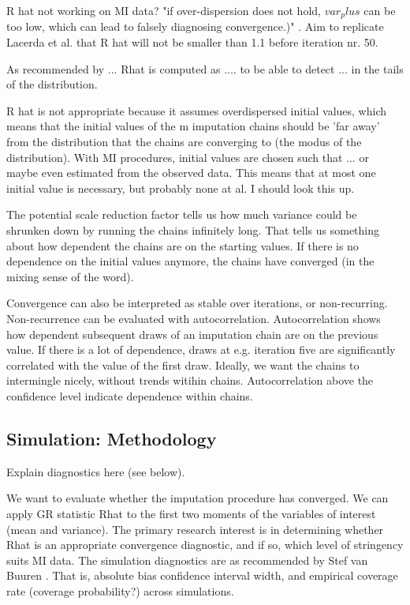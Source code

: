 \documentclass[article]{jss}
\begin{document}
R hat not working on MI data? "if over-dispersion does not hold, $var_plus$ can be too low, which can lead to falsely diagnosing convergence.)" \cite[p~437]{broo98}. Aim to replicate Lacerda et al. that R hat will not be smaller than 1.1 before iteration nr. 50.

As recommended by ... Rhat is computed as .... to be able to detect ... in the tails of the distribution.

R hat is not appropriate because it assumes overdispersed initial values, which means that the initial values of the m imputation chains should be 'far away' from the distribution that the chains are converging to (the modus of the distribution). With MI procedures, initial values are chosen such that ... or maybe even estimated from the observed data. This means that at most one initial value is necessary, but probably none at al. I should look this up. 

The potential scale reduction factor tells us how much variance could be shrunken down by running the chains infinitely long. That tells us something about how dependent the chains are on the starting values. If there is no dependence on the initial values anymore, the chains have converged (in the mixing sense of the word).

Convergence can also be interpreted as stable over iterations, or non-recurring. Non-recurrence can be evaluated with autocorrelation. Autocorrelation shows how dependent subsequent draws of an imputation chain are on the previous value. If there is a lot of dependence, draws at e.g. iteration five are significantly correlated with the value of the first draw. Ideally, we want the chains to intermingle nicely, without trends witihin chains. Autocorrelation above the confidence level indicate dependence within chains.    

\subsection{Simulation: Methodology}

Explain diagnostics here (see below). 

We want to evaluate whether the imputation procedure has converged. We can apply GR statistic Rhat to the first two moments of the variables of interest (mean and variance). The primary research interest is in determining whether Rhat is an appropriate convergence diagnostic, and if so, which level of stringency suits MI data. The simulation diagnostics are as recommended by Stef van Buuren \cite{buur18}. That is, absolute bias confidence interval width, and empirical coverage rate (coverage probability?) across simulations.
\end{document}

